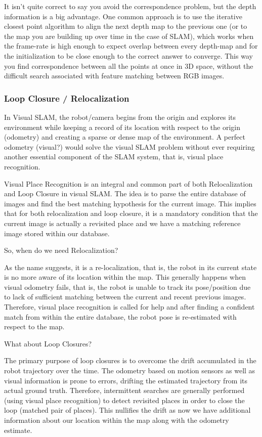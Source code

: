 It isn’t quite correct to say you avoid the correspondence problem, but the depth information is a big advantage. One common approach is to use the iterative closest point algorithm to align the next depth map to the previous one (or to the map you are building up over time in the case of SLAM), which works when the frame-rate is high enough to expect overlap between every depth-map and for the initialization to be close enough to the correct answer to converge. This way you find correspondence between all the points at once in 3D space, without the difficult search associated with feature matching between RGB images.

\subsubsection{Loop Closure / Relocalization}
In Visual SLAM, the robot/camera begins from the origin and explores its environment while keeping a record of its location with respect to the origin (odometry) and creating a sparse or dense map of the environment. A perfect odometry (visual?) would solve the visual SLAM problem without ever requiring another essential component of the SLAM system, that is, visual place recognition.

Visual Place Recognition is an integral and common part of both Relocalization and Loop Closure in visual SLAM. The idea is to parse the entire database of images and find the best matching hypothesis for the current image. This implies that for both relocalization and loop closure, it is a mandatory condition that the current image is actually a revisited place and we have a matching reference image stored within our database.

So, when do we need Relocalization?

As the name suggests, it is a re-localization, that is, the robot in its current state is no more aware of its location within the map. This generally happens when visual odometry fails, that is, the robot is unable to track its pose/position due to lack of sufficient matching between the current and recent previous images. Therefore, visual place recognition is called for help and after finding a confident match from within the entire database, the robot pose is re-estimated with respect to the map.

What about Loop Closures?

The primary purpose of loop closures is to overcome the drift accumulated in the robot trajectory over the time. The odometry based on motion sensors as well as visual information is prone to errors, drifting the estimated trajectory from its actual ground truth. Therefore, intermittent searches are generally performed (using visual place recognition) to detect revisited places in order to close the loop (matched pair of places). This nullifies the drift as now we have additional information about our location within the map along with the odometry estimate.

